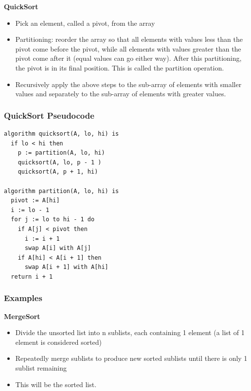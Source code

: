 \documentclass{beamer}
\begin{document}
    \begin{frame}
    	\textbf{QuickSort}
    	\begin{itemize}
    	\item Pick an element, called a pivot, from the array
    	\item Partitioning: reorder the array so that all elements with values less than the pivot come before the pivot, while all elements with values greater than the pivot come after it (equal values can go either way). After this partitioning, the pivot is in its final position. This is called the partition operation.
    	\item Recursively apply the above steps to the sub-array of elements with smaller values and separately to the sub-array of elements with greater values.
    \end{itemize}
    \end{frame}
  \begin{frame}[fragile=singleslide]
  	\frametitle{QuickSort Pseudocode}
  	\begin{lstlisting}
algorithm quicksort(A, lo, hi) is
  if lo < hi then
    p := partition(A, lo, hi)
    quicksort(A, lo, p - 1 )
    quicksort(A, p + 1, hi)

algorithm partition(A, lo, hi) is
  pivot := A[hi]
  i := lo - 1    
  for j := lo to hi - 1 do
    if A[j] < pivot then
      i := i + 1
      swap A[i] with A[j]
    if A[hi] < A[i + 1] then
      swap A[i + 1] with A[hi]
  return i + 1
  	\end{lstlisting}
  \end{frame}
     \begin{frame}
     	\frametitle{Examples}
     	\textbf{MergeSort}
     	\begin{itemize}
     		\item Divide the unsorted list into n sublists, each containing 1 element (a list of 1 element is considered sorted)
     		\item Repeatedly merge sublists to produce new sorted sublists until there is only 1 sublist remaining
     		\item This will be the sorted list.
     		
     	\end{itemize}
     \end{frame}
\end{document}
